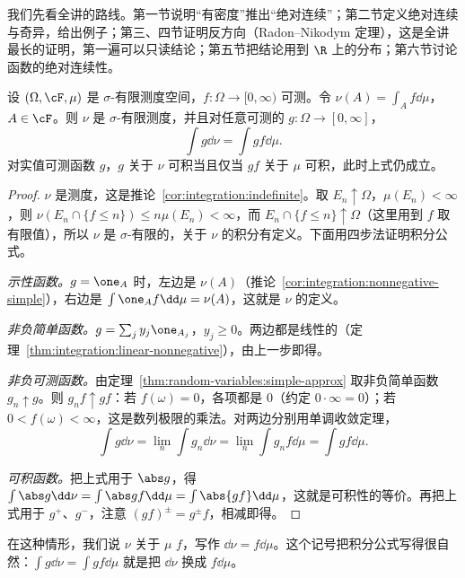 我们先看全讲的路线。第一节说明“有密度”推出“绝对连续”；第二节定义绝对连续与奇异，给出例子；第三、四节证明反方向（Radon--Nikodym 定理），这是全讲最长的证明，第一遍可以只读结论；第五节把结论用到 $\R$ 上的分布；第六节讨论函数的绝对连续性。


\begin{proposition}\label{prop:ac:density-measure}
设 $(\Omega,\cF,\mu)$ 是 $\sigma$-有限测度空间，$f:\Omega\to[0,\infty)$ 可测。令 $\nu(A)=\int_Af\dd\mu$，$A\in\cF$。则 $\nu$ 是 $\sigma$-有限测度，并且对任意可测的 $g:\Omega\to[0,\infty]$，
\[
\int g\dd\nu=\int gf\dd\mu .
\]
对实值可测函数 $g$，$g$ 关于 $\nu$ 可积当且仅当 $gf$ 关于 $\mu$ 可积，此时上式仍成立。
\end{proposition}
\begin{proof}
$\nu$ 是测度，这是推论~\ref{cor:integration:indefinite}。取 $E_n\uparrow\Omega$，$\mu(E_n)<\infty$，则 $\nu(E_n\cap\{f\leqslant n\})\leqslant n\mu(E_n)<\infty$，而 $E_n\cap\{f\leqslant n\}\uparrow\Omega$（这里用到 $f$ 取有限值），所以 $\nu$ 是 $\sigma$-有限的，关于 $\nu$ 的积分有定义。下面用四步法证明积分公式。

\emph{示性函数。}$g=\one_A$ 时，左边是 $\nu(A)$（推论~\ref{cor:integration:nonnegative-simple}），右边是 $\int\one_Af\dd\mu=\nu(A)$，这就是 $\nu$ 的定义。

\emph{非负简单函数。}$g=\sum_jy_j\one_{A_j}$，$y_j\geqslant0$。两边都是线性的（定理~\ref{thm:integration:linear-nonnegative}），由上一步即得。

\emph{非负可测函数。}由定理~\ref{thm:random-variables:simple-approx} 取非负简单函数 $g_n\uparrow g$。则 $g_nf\uparrow gf$：若 $f(\omega)=0$，各项都是 $0$（约定 $0\cdot\infty=0$）；若 $0<f(\omega)<\infty$，这是数列极限的乘法。对两边分别用单调收敛定理，
\[
\int g\dd\nu=\lim_n\int g_n\dd\nu=\lim_n\int g_nf\dd\mu=\int gf\dd\mu .
\]

\emph{可积函数。}把上式用于 $\abs g$，得 $\int\abs g\dd\nu=\int\abs gf\dd\mu=\int\abs{gf}\dd\mu$，这就是可积性的等价。再把上式用于 $g^+$、$g^-$，注意 $(gf)^\pm=g^\pm f$，相减即得。
\end{proof}

在这种情形，我们说 $\nu$ 关于 $\mu$  $f$，写作 $\dd\nu=f\dd\mu$。这个记号把积分公式写得很自然：$\int g\dd\nu=\int gf\dd\mu$ 就是把 $\dd\nu$ 换成 $f\dd\mu$。

